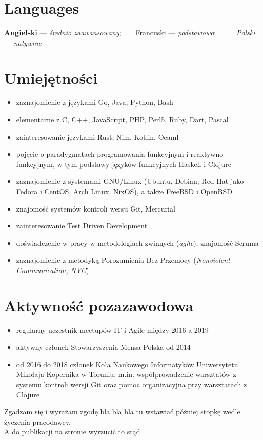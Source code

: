 \documentclass[a4paper]{res}
\begin{document}
\begin{resume}
    \section{Languages}
    \vspace{0.05in}
    \textbf{Angielski} — \textsl{średnio zaawansowany}; ~ ~ 
    Francuski — \textsl{podstawowo}; ~ ~ ~
    \textit{Polski} — \textsl{natywnie}
    \section{Umiejętności}
    \vspace{0.1in}
    \begin{itemize}
    		\item zaznajomienie z językami Go, Java, Python, Bash
    		\item elementarne z C, C++, JavaScript, PHP, Perl5, Ruby, Dart, Pascal
    		\item zainteresowanie językami Rust, Nim, Kotlin, Ocaml
       	\item pojęcie o paradygmatach programowania funkcyjnym i reaktywno-funkcyjnym, w tym podstawy języków funkcyjnych Haskell i Clojure
        \item zaznajomienie z systemami GNU/Linux (Ubuntu, Debian, Red Hat jako Fedora i CentOS, Arch Linux, NixOS), a także FreeBSD i OpenBSD
        \item znajomość systemów kontroli wersji Git, Mercurial
        \item zainteresowanie Test Driven Development
        \vspace{0.04in}
        \item doświadczenie w pracy w metodologiach zwinnych (\textsl{agile}), znajomość Scruma
        \item zaznajomienie z metodyką Porozumienia Bez Przemocy (\textsl{Nonviolent Communication, NVC})
    \end{itemize}
    \section{Aktywność pozazawodowa}
    \begin{itemize}
        \item regularny uczestnik meetupów IT i Agile między 2016 a 2019
        \item aktywny członek Stowarzyszenia Mensa Polska od 2014
        \item od 2016 do 2018 członek Koła Naukowego Informatyków
        Uniwersytetu Mikołaja Kopernika w Toruniu: m.in.
        współprowadzenie warsztatów z systemu kontroli wersji Git
        oraz pomoc organizacyjna przy warsztatach z Clojure		
    \end{itemize}
\end{resume}
\begin{center}
    \noindent\makebox[\dimexpr\linewidth]{\rule{\dimexpr\paperwidth-3in}{0.4pt}}
    \footnotesize
    Zgadzam się i wyrażam zgodę bla bla bla tu wstawiać później stopkę wedle życzenia pracodawcy.\\
    A do publikacji na stronie wyrzucić to stąd.
\end{center}
\end{document}
